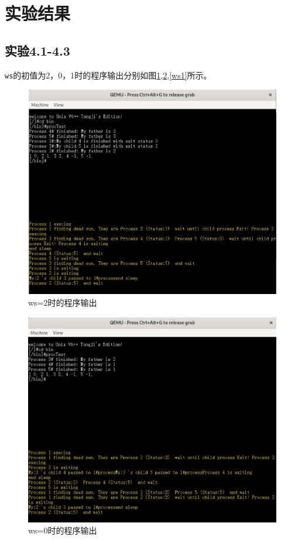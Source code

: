 \section{实验结果}
\subsection{实验4.1-4.3}
\texttt{ws}的初值为2，0，1时的程序输出分别如图\ref{ws2},\ref{ws0},\ref{ws1}所示。

\begin{figure}[!htbp]
    \centering
    \includegraphics[width=\textwidth]{images/ws2.png}
    \caption{ws=2时的程序输出}\label{ws2}
\end{figure}

\begin{figure}[!htbp]
    \centering
    \includegraphics[width=\textwidth]{images/ws0.png}
    \caption{ws=0时的程序输出}\label{ws0}
\end{figure}

